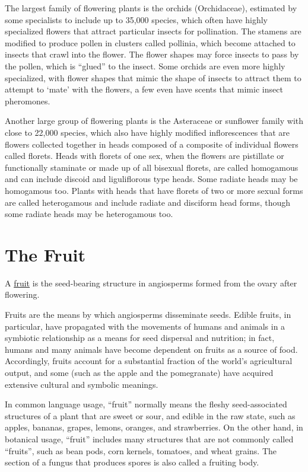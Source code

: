 The largest family of flowering plants is the orchids (Orchidaceae), estimated by some specialists to include up to 35,000 species, which often have highly specialized flowers that attract particular insects for pollination. The stamens are modified to produce pollen in clusters called pollinia, which become attached to insects that crawl into the flower. The flower shapes may force insects to pass by the pollen, which is ``glued'' to the insect. Some orchids are even more highly specialized, with flower shapes that mimic the shape of insects to attract them to attempt to `mate' with the flowers, a few even have scents that mimic insect pheromones.

Another large group of flowering plants is the Asteraceae or sunflower family with close to 22,000 species, which also have highly modified inflorescences that are flowers collected together in heads composed of a composite of individual flowers called florets. Heads with florets of one sex, when the flowers are pistillate or functionally staminate or made up of all bisexual florets, are called homogamous and can include discoid and liguliflorous type heads. Some radiate heads may be homogamous too. Plants with heads that have florets of two or more sexual forms are called heterogamous and include radiate and disciform head forms, though some radiate heads may be heterogamous too.

\hypertarget{the-fruit}{%
\section{The Fruit}\label{the-fruit}}

A \href{https://en.wikipedia.org/wiki/Fruit}{fruit} is the seed-bearing structure in angiosperms formed from the ovary after flowering.

Fruits are the means by which angiosperms disseminate seeds. Edible fruits, in particular, have propagated with the movements of humans and animals in a symbiotic relationship as a means for seed dispersal and nutrition; in fact, humans and many animals have become dependent on fruits as a source of food. Accordingly, fruits account for a substantial fraction of the world's agricultural output, and some (such as the apple and the pomegranate) have acquired extensive cultural and symbolic meanings.

In common language usage, ``fruit'' normally means the fleshy seed-associated structures of a plant that are sweet or sour, and edible in the raw state, such as apples, bananas, grapes, lemons, oranges, and strawberries. On the other hand, in botanical usage, ``fruit'' includes many structures that are not commonly called ``fruits'', such as bean pods, corn kernels, tomatoes, and wheat grains. The section of a fungus that produces spores is also called a fruiting body.



